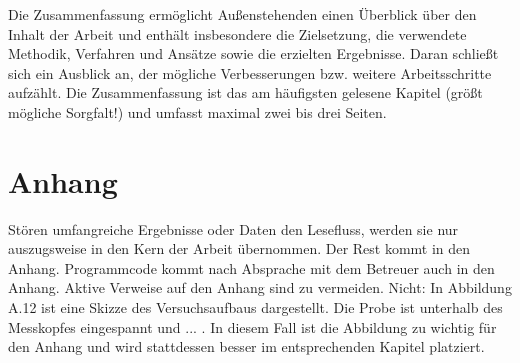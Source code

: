 Die Zusammenfassung ermöglicht Außenstehenden einen Überblick über den Inhalt der Arbeit und enthält insbesondere die Zielsetzung, die verwendete Methodik, Verfahren und Ansätze sowie die erzielten Ergebnisse. Daran schließt sich ein Ausblick an, der mögliche Verbesserungen bzw. weitere Arbeitsschritte aufzählt. Die Zusammenfassung ist das am häufigsten gelesene Kapitel (größt mögliche Sorgfalt!) und umfasst maximal zwei bis drei Seiten.

\section{Anhang}

Stören umfangreiche Ergebnisse oder Daten den Lesefluss, werden sie nur auszugsweise in den Kern der Arbeit übernommen. Der Rest kommt in den Anhang. Programmcode kommt nach Absprache mit dem Betreuer auch in den Anhang. Aktive Verweise auf den Anhang sind zu vermeiden. Nicht: \glqq In Abbildung A.12 ist eine Skizze des Versuchsaufbaus dargestellt. Die Probe ist unterhalb des Messkopfes eingespannt und ... \grqq. In diesem Fall ist die Abbildung zu wichtig für den Anhang und wird stattdessen besser im entsprechenden Kapitel platziert.
